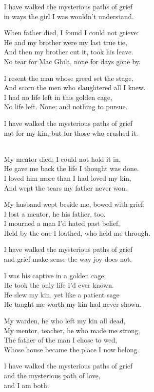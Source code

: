 \begin{lyrics}
I have walked the mysterious paths of grief\\
in ways the girl I was wouldn't understand.

When father died, I found I could not grieve:\\
He and my brother were my last true tie,\\
And then my brother cut it, took his leave.\\
No tear for Mac Ghilt, none for days gone by.

I resent the man whose greed set the stage,\\
And scorn the men who slaughtered all I knew.\\
I had no life left in this golden cage,\\
No life left. None; and nothing to pursue.

I have walked the mysterious paths of grief\\
not for my kin, but for those who crushed it.

\\
My mentor died; I could not hold it in.\\
He gave me back the life I thought was done.\\
I loved him more than I had loved my kin,\\
And wept the tears my father never won.

My husband wept beside me, bowed with grief;\\
I lost a mentor, he his father, too.\\
I mourned a man I’d hated past belief,\\
Held by the one I loathed, who held me through.

I have walked the mysterious paths of grief\\
and grief make sense the way joy does not.

I was his captive in a golden cage;\\
He took the only life I’d ever known.\\
He slew my kin, yet like a patient sage\\
He taught me worth my kin had never shown.

My warden, he who left my kin all dead,\\
My mentor, teacher, he who made me strong,\\
The father of the man I chose to wed,\\
Whose house became the place I now belong.

I have walked the mysterious paths of grief\\
and the mysterious path of love,\\
and I am both.
\end{lyrics}

